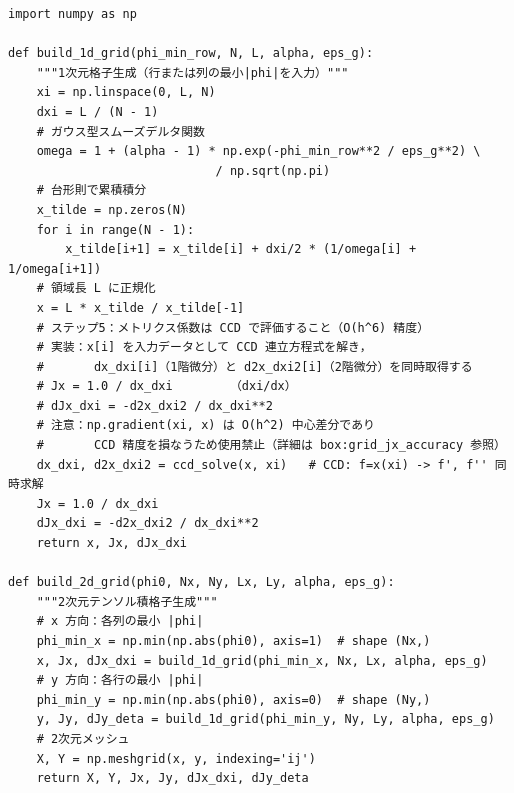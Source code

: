 \begin{tcolorbox}[algbox, title={格子生成アルゴリズム（擬似コード）}]
\begin{verbatim}
import numpy as np

def build_1d_grid(phi_min_row, N, L, alpha, eps_g):
    """1次元格子生成（行または列の最小|phi|を入力）"""
    xi = np.linspace(0, L, N)
    dxi = L / (N - 1)
    # ガウス型スムーズデルタ関数
    omega = 1 + (alpha - 1) * np.exp(-phi_min_row**2 / eps_g**2) \
                             / np.sqrt(np.pi)
    # 台形則で累積積分
    x_tilde = np.zeros(N)
    for i in range(N - 1):
        x_tilde[i+1] = x_tilde[i] + dxi/2 * (1/omega[i] + 1/omega[i+1])
    # 領域長 L に正規化
    x = L * x_tilde / x_tilde[-1]
    # ステップ5：メトリクス係数は CCD で評価すること（O(h^6) 精度）
    # 実装：x[i] を入力データとして CCD 連立方程式を解き，
    #       dx_dxi[i]（1階微分）と d2x_dxi2[i]（2階微分）を同時取得する
    # Jx = 1.0 / dx_dxi        （dxi/dx）
    # dJx_dxi = -d2x_dxi2 / dx_dxi**2
    # 注意：np.gradient(xi, x) は O(h^2) 中心差分であり
    #       CCD 精度を損なうため使用禁止（詳細は box:grid_jx_accuracy 参照）
    dx_dxi, d2x_dxi2 = ccd_solve(x, xi)   # CCD: f=x(xi) -> f', f'' 同時求解
    Jx = 1.0 / dx_dxi
    dJx_dxi = -d2x_dxi2 / dx_dxi**2
    return x, Jx, dJx_dxi

def build_2d_grid(phi0, Nx, Ny, Lx, Ly, alpha, eps_g):
    """2次元テンソル積格子生成"""
    # x 方向：各列の最小 |phi|
    phi_min_x = np.min(np.abs(phi0), axis=1)  # shape (Nx,)
    x, Jx, dJx_dxi = build_1d_grid(phi_min_x, Nx, Lx, alpha, eps_g)
    # y 方向：各行の最小 |phi|
    phi_min_y = np.min(np.abs(phi0), axis=0)  # shape (Ny,)
    y, Jy, dJy_deta = build_1d_grid(phi_min_y, Ny, Ly, alpha, eps_g)
    # 2次元メッシュ
    X, Y = np.meshgrid(x, y, indexing='ij')
    return X, Y, Jx, Jy, dJx_dxi, dJy_deta
\end{verbatim}
\end{tcolorbox}
